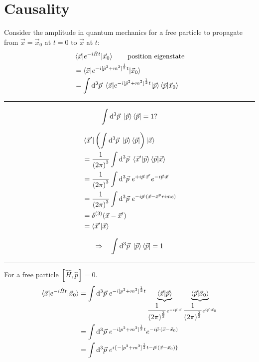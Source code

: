 \documentclass{article}
\begin{document}
\section{Causality}

Consider the amplitude in quantum mechanics for a free particle to propagate from $ \vec{x} = \vec{x}_0 $ at $ t = 0 $ to $ \vec{x} $ at $t$:
\begin{align*}
& \braket{ \vec{x} | e^{ -i \hat{H} t } | \vec{x}_0 } \qquad \mathrm{position~eigenstate} \\
&= \braket{ \vec{x} | e^{ -i {[ \hat{p}^2 + m^2 ]}^\frac{1}{2} t } | \vec{x}_0 } \\
&= \int \mathrm{d}^3 \vec{p} ~ \braket{ \vec{x} | e^{ -i {[ \hat{p}^2 + m^2 ]}^\frac{1}{2} t } | \vec{p} } \braket{ \vec{p} | \vec{x}_0 }
\end{align*}

\noindent\rule{\textwidth}{.5pt}


\begin{equation*}
\int \mathrm{d}^3 \vec{p} ~ \ket{\vec{p}} \bra{\vec{p}} = 1 ?
\end{equation*}

\begin{align*}
& \braket{ \vec{x}^\prime | \left( \int \mathrm{d}^3 \vec{p} ~ \ket{\vec{p}} \bra{\vec{p}} \right) | \vec{x} } \\
&= \frac{1}{{(2 \pi)}^3} \int \mathrm{d}^3 \vec{p} ~ \braket{ \vec{x}^\prime | \vec{p} } \braket{ \vec{p} | \vec{x} } \\
&= \frac{1}{{(2 \pi)}^3} \int \mathrm{d}^3 \vec{p} ~ e^{ +i \vec{p} \cdot \vec{x}^\prime } e^{ -i \vec{p} \cdot \vec{x} } \\
&= \frac{1}{{(2 \pi)}^3} \int \mathrm{d}^3 \vec{p} ~ e^{ -i \vec{p} \cdot ( \vec{x} - \vec{x}^prime ) } \\
&= \delta^{(3)} ( \vec{x} - \vec{x}^\prime ) \\
&= \braket{ \vec{x}^\prime | \vec{x} }
\end{align*}

\begin{equation*}
\Rightarrow \quad \int \mathrm{d}^3 \vec{p} ~ \ket{\vec{p}} \bra{\vec{p}} = 1
\end{equation*}

\noindent\rule{\textwidth}{.5pt}


\noindent For a free particle $[ \hat{H}, \hat{p} ] = 0 $.
\begin{align*}
\braket{ \vec{x} | e^{ -i \hat{H} t } | \vec{x}_0 } &= \int \mathrm{d}^3 \vec{p} ~ e^{ -i {[ p^2 + m^2 ]}^\frac{1}{2} t } \underbrace{\braket{ \vec{x} | \vec{p} }}_{ \dfrac{1}{{(2 \pi)}^\frac{3}{2}} e^{ -i \vec{p} \cdot \vec{x} } } \underbrace{\braket{ \vec{p} | \vec{x}_0 }}_{ \dfrac{1}{{(2 \pi)}^\frac{3}{2}} e^{ i \vec{p} \cdot \vec{x}_0 } } \\
&= \int \mathrm{d}^3 \vec{p} ~ e^{ -i {[ p^2 + m^2 ]}^\frac{1}{2} t } e^{ -i \vec{p} \cdot ( \vec{x} - \vec{x}_0 ) } \\
&= \int \mathrm{d}^3 \vec{p} ~ e^{ i \lbrace -{[ p^2 + m^2 ]}^\frac{1}{2} t - \vec{p} \cdot ( \vec{x} - \vec{x}_0 ) \rbrace }
\end{align*}
\end{document}
